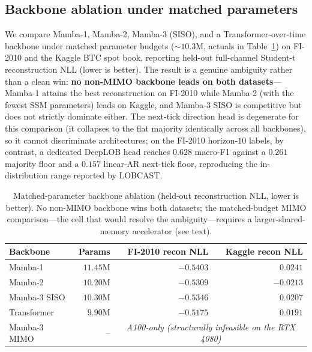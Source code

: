 
\subsection{Backbone ablation under matched parameters}\label{sec:results_ablation}

We compare Mamba-1, Mamba-2, Mamba-3 (SISO), and a Transformer-over-time backbone under
matched parameter budgets ($\sim\!10.3$M, actuals in Table~\ref{tab:backbone_ablation}) on
FI-2010 and the Kaggle BTC spot book, reporting held-out full-channel Student-t
reconstruction NLL (lower is better). The result is a genuine ambiguity rather than a clean
win: \textbf{no non-MIMO backbone leads on both datasets}---Mamba-1 attains the best
reconstruction on FI-2010 while Mamba-2 (with the fewest SSM parameters) leads on Kaggle,
and Mamba-3 SISO is competitive but does not strictly dominate either. The next-tick
direction head is degenerate for this comparison (it collapses to the flat majority
identically across all backbones), so it cannot discriminate architectures; on the FI-2010
horizon-$10$ labels, by contrast, a dedicated DeepLOB head reaches $0.628$ macro-F1 against
a $0.261$ majority floor and a $0.157$ linear-AR next-tick floor, reproducing the
in-distribution range reported by LOBCAST.

\begin{table}[t]
\centering
\small
\begin{tabular}{lrrr}
\toprule
Backbone & Params & FI-2010 recon NLL & Kaggle recon NLL \\
\midrule
Mamba-1      & $11.45$M & $\mathbf{-0.5403}$ & $0.0241$ \\
Mamba-2      & $10.20$M & $-0.5309$ & $\mathbf{-0.0213}$ \\
Mamba-3 SISO & $10.30$M & $-0.5346$ & $0.0207$ \\
Transformer  & $9.90$M  & $-0.5175$ & $0.0191$ \\
Mamba-3 MIMO & --       & \multicolumn{2}{c}{\emph{A100-only (structurally infeasible on the RTX 4080)}} \\
\bottomrule
\end{tabular}
\caption{Matched-parameter backbone ablation (held-out reconstruction NLL, lower is better).
No non-MIMO backbone wins both datasets; the matched-budget MIMO comparison---the cell that
would resolve the ambiguity---requires a larger-shared-memory accelerator (see text).}
\label{tab:backbone_ablation}
\end{table}

